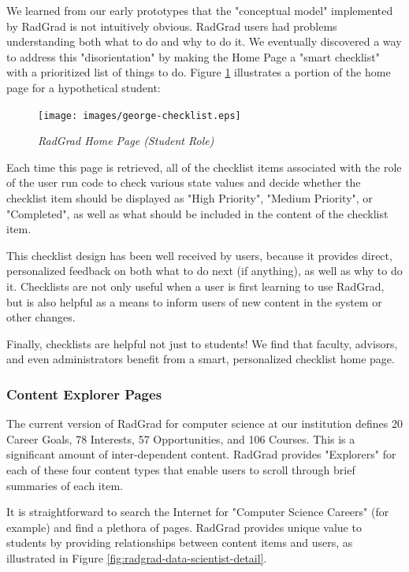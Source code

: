 \documentclass[acmsmall]{acmart}
\begin{document}
We learned from our early prototypes that the "conceptual model" implemented by RadGrad is not intuitively obvious. RadGrad users had problems understanding both what to do and why to do it.  We eventually discovered a way to address this "disorientation" by making the Home Page a "smart checklist" with a prioritized list of things to do.  Figure \ref{fig:radgrad-student-home-page} illustrates a portion of the home page for a hypothetical student:

\begin{figure}[ht]
\centering
\texttt{[image: images/george-checklist.eps]}
\caption{\em RadGrad Home Page (Student Role)}
\label{fig:radgrad-student-home-page}
\end{figure}

Each time this page is retrieved, all of the checklist items associated with the role of the user run code to check various state values and decide whether the checklist item should be displayed as "High Priority", "Medium Priority", or "Completed", as well as what should be included in the content of the checklist item.

This checklist design has been well received by users, because it provides direct, personalized feedback on both what to do next (if anything), as well as why to do it. Checklists are not only useful when a user is first learning to use RadGrad, but is also helpful as a means to inform users of new content in the system or other changes.

Finally, checklists are helpful not just to students!  We find that faculty, advisors, and even administrators benefit from a smart, personalized checklist home page.

\subsubsection{Content Explorer Pages}

The current version of RadGrad for computer science at our institution defines 20 Career Goals, 78 Interests, 57 Opportunities, and 106 Courses. This is a significant amount of inter-dependent content.  RadGrad provides "Explorers" for each of these four content types that enable users to scroll through brief summaries of each item.

It is straightforward to search the Internet for "Computer Science Careers" (for example) and find a plethora of pages. RadGrad provides unique value to students by providing relationships between content items and users, as illustrated in Figure \ref{fig:radgrad-data-scientist-detail}.
\end{document}
